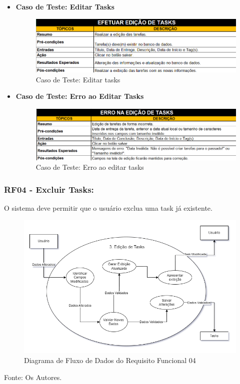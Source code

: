 \documentclass[a4paper,12pt]{article}
\begin{document}
\pagebreak
\begin{itemize}
	\item\textbf{Caso de Teste: Editar Tasks}
	\begin{figure}[H]
		\centering
		\includegraphics[scale=0.75]{UnitTest/trueCase/editTask.png}
		\caption{Caso de Teste: Editar tasks}
	\end{figure}
	\item\textbf{Caso de Teste: Erro ao Editar Tasks}
	\begin{figure}[H]
		\centering
		\includegraphics[scale=0.75]{UnitTest/falseCase/editTask.png}
		\caption{Caso de Teste: Erro ao editar tasks}
	\end{figure}
\end{itemize}

\pagebreak
\subsubsection{RF04 - Excluir Tasks:}
O sistema deve permitir que o usuário exclua uma task já existente.
\begin{figure}[H]
	\centering
	\includegraphics[scale=0.45]{DFDs/RF03.drawio.png}
	\caption{Diagrama de Fluxo de Dados do Requisito Funcional 04}
\end{figure}
\noindent Fonte: Os Autores.
\end{document}
